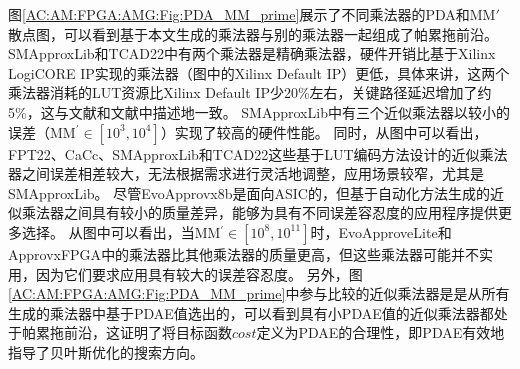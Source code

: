 图\ref{AC:AM:FPGA:AMG:Fig:PDA_MM_prime}展示了不同乘法器的PDA和MM$\prime$散点图，可以看到基于本文生成的乘法器与别的乘法器一起组成了帕累拖前沿。SMApproxLib和TCAD22中有两个乘法器是精确乘法器，硬件开销比基于Xilinx LogiCORE IP实现的乘法器（图中的Xilinx Default IP）更低，具体来讲，这两个乘法器消耗的LUT资源比Xilinx Default IP少20\%左右，关键路径延迟增加了约5\%，这与文献\cite{AC:AM:FPGA:SMApproxLib}和文献\cite{AC:AM:FPGA:TCAD22}中描述地一致。
SMApproxLib中有三个近似乘法器以较小的误差（MM$^\prime\in[10^3,10^4]$）实现了较高的硬件性能。
同时，从图中可以看出，FPT22、CaCc、SMApproxLib和TCAD22这些基于LUT编码方法设计的近似乘法器之间误差相差较大，无法根据需求进行灵活地调整，应用场景较窄，尤其是SMApproxLib。
尽管EvoApprovx8b\cite{AC:AM:CGP_Evoapprox8b}是面向ASIC的，但基于自动化方法生成的近似乘法器之间具有较小的质量差异，能够为具有不同误差容忍度的应用程序提供更多选择。
从图中可以看出，当MM$^\prime \in [10^8,10^{11}]$时，EvoApproveLite\cite{AC:AM:CGP_EvoLite}和ApprovxFPGA\cite{AC:AM:FPGA:ApproxFPGAs}中的乘法器比其他乘法器的质量更高，但这些乘法器可能并不实用，因为它们要求应用具有较大的误差容忍度。
另外，图\ref{AC:AM:FPGA:AMG:Fig:PDA_MM_prime}中参与比较的近似乘法器是是从所有生成的乘法器中基于PDAE值选出的，可以看到具有小PDAE值的近似乘法器都处于帕累拖前沿，这证明了将目标函数$cost$定义为PDAE的合理性，即PDAE有效地指导了贝叶斯优化的搜索方向。

